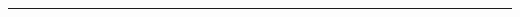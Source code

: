 {\vglue-482.3pt
\vrule height 473.3pt depth 8pt width 0.1pt 
\vglue-482.3pt
\vrule height 473.3pt depth 8pt width 0.1pt 
\vglue-482.3pt
\vrule height 473.3pt depth 8pt width 0.1pt 
\vglue-482.3pt
\vrule height 473.3pt depth 8pt width 0.1pt 
\vglue-482.3pt
\hglue-0.4pt
\vrule height 473.3pt depth 8pt width 0.8pt 
\vglue-482.3pt
\vrule height 473.3pt depth 8pt width 0.1pt 
\vglue-482.3pt
\vrule height 473.3pt depth 8pt width 0.1pt 
\vglue-482.3pt
\vrule height 473.3pt depth 8pt width 0.1pt 
\vglue-482.3pt
\vrule height 473.3pt depth 8pt width 0.1pt 
\vglue-482.3pt
\vrule height 473.3pt depth 8pt width 0.1pt 
\vglue-482.3pt
\vrule height 473.3pt depth 8pt width 0.1pt 
\vglue-482.3pt
\vrule height 473.3pt depth 8pt width 0.1pt 
\vglue-482.3pt
\vrule height 473.3pt depth 8pt width 0.1pt 
\vglue-482.3pt
\vrule height 473.3pt depth 8pt width 0.1pt 
\vglue-482.3pt
\hglue-0.4pt
\vrule height 473.3pt depth 8pt width 0.8pt 
\vglue-482.3pt
\vrule height 473.3pt depth 8pt width 0.1pt 
\vglue-482.3pt
\vrule height 473.3pt depth 8pt width 0.1pt 
\vglue-482.3pt
\vrule height 473.3pt depth 8pt width 0.1pt 
\vglue-482.3pt
\vrule height 473.3pt depth 8pt width 0.1pt 
\vglue-482.3pt
\vrule height 473.3pt depth 8pt width 0.1pt 
\vglue-482.3pt
\vrule height 473.3pt depth 8pt width 0.1pt 
\vglue-482.3pt
\vrule height 473.3pt depth 8pt width 0.1pt 
\vglue-482.3pt
\vrule height 473.3pt depth 8pt width 0.1pt 
\vglue-482.3pt
\vrule height 473.3pt depth 8pt width 0.1pt 
\vglue-482.3pt
\hglue-0.4pt
\vrule height 473.3pt depth 8pt width 0.8pt 
\vglue-482.3pt
\vrule height 473.3pt depth 8pt width 0.1pt 
\vglue-482.3pt
\vrule height 473.3pt depth 8pt width 0.1pt 
\vglue-482.3pt
\vrule height 473.3pt depth 8pt width 0.1pt 
\vglue-482.3pt
\vrule height 473.3pt depth 8pt width 0.1pt 
\vglue-482.3pt
\vrule height 473.3pt depth 8pt width 0.1pt 
\vglue-482.3pt
\vrule height 473.3pt depth 8pt width 0.1pt 
\vglue-482.3pt
\vrule height 473.3pt depth 8pt width 0.1pt 
\vglue-482.3pt
\vrule height 473.3pt depth 8pt width 0.1pt 
\vglue-482.3pt
\vrule height 473.3pt depth 8pt width 0.1pt 
\vglue-482.3pt
\hglue-0.4pt
\vrule height 473.3pt depth 8pt width 0.8pt }
\vglue-481.3pt
\hrule height 0.4pt depth 0.4pt width 375pt
